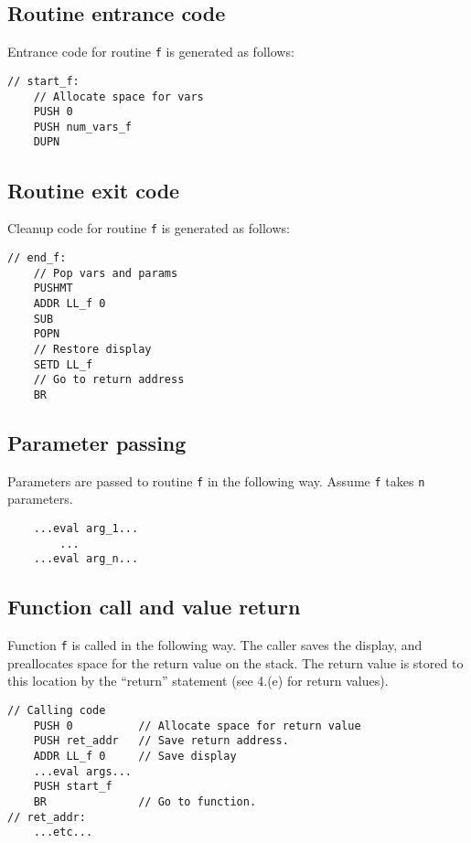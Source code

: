 \documentclass[11pt]{article}
\begin{document}
\subsection{Routine entrance code}

Entrance code for routine \texttt{f} is generated as follows:

\begin{verbatim}
// start_f:
    // Allocate space for vars
    PUSH 0
    PUSH num_vars_f
    DUPN
\end{verbatim}

\subsection{Routine exit code}

Cleanup code for routine \texttt{f} is generated as follows:

\begin{verbatim}
// end_f:
    // Pop vars and params
    PUSHMT
    ADDR LL_f 0
    SUB
    POPN
    // Restore display
    SETD LL_f
    // Go to return address
    BR
\end{verbatim}

\subsection{Parameter passing}

Parameters are passed to routine \texttt{f} in the following way.
Assume \texttt{f} takes \texttt{n} parameters.

\begin{verbatim}
    ...eval arg_1...
        ...
    ...eval arg_n...
\end{verbatim}

\subsection{Function call and value return}

Function \texttt{f} is called in the following way.  The caller saves the
display, and preallocates space for the return value on the stack.  The return
value is stored to this location by the ``return'' statement (see 4.(e) for
return values).

\begin{verbatim}
// Calling code
    PUSH 0          // Allocate space for return value
    PUSH ret_addr   // Save return address.
    ADDR LL_f 0     // Save display
    ...eval args...
    PUSH start_f
    BR              // Go to function.
// ret_addr:
    ...etc...
\end{verbatim}
\end{document}
